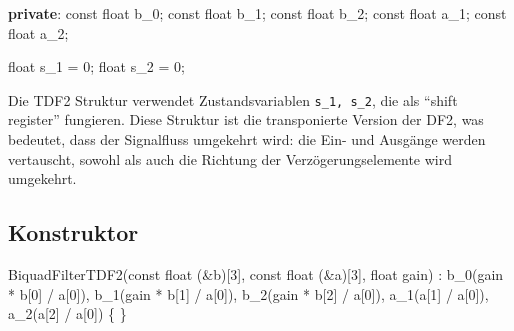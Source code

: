 \documentclass[
  ngerman,
  letterpaper,
  DIV=11]{scrreprt}
\newenvironment{Shaded}{\begin{snugshade}}{\end{snugshade}}
\newcommand{\AttributeTok}[1]{\textcolor[rgb]{0.40,0.45,0.13}{#1}}
\newcommand{\DataTypeTok}[1]{\textcolor[rgb]{0.68,0.00,0.00}{#1}}
\newcommand{\DecValTok}[1]{\textcolor[rgb]{0.68,0.00,0.00}{#1}}
\newcommand{\KeywordTok}[1]{\textcolor[rgb]{0.00,0.23,0.31}{\textbf{#1}}}
\newcommand{\NormalTok}[1]{\textcolor[rgb]{0.00,0.23,0.31}{#1}}
\newcommand{\OperatorTok}[1]{\textcolor[rgb]{0.37,0.37,0.37}{#1}}
\newcommand{\VariableTok}[1]{\textcolor[rgb]{0.07,0.07,0.07}{#1}}
\begin{document}
\begin{Shaded}
\begin{Highlighting}[]
\KeywordTok{private}\OperatorTok{:}
  \AttributeTok{const} \DataTypeTok{float}\NormalTok{ b\_0}\OperatorTok{;} 
  \AttributeTok{const} \DataTypeTok{float}\NormalTok{ b\_1}\OperatorTok{;}
  \AttributeTok{const} \DataTypeTok{float}\NormalTok{ b\_2}\OperatorTok{;}
  \AttributeTok{const} \DataTypeTok{float}\NormalTok{ a\_1}\OperatorTok{;}
  \AttributeTok{const} \DataTypeTok{float}\NormalTok{ a\_2}\OperatorTok{;}

  \DataTypeTok{float} \VariableTok{s\_1} \OperatorTok{=} \DecValTok{0}\OperatorTok{;}
  \DataTypeTok{float} \VariableTok{s\_2} \OperatorTok{=} \DecValTok{0}\OperatorTok{;}
\end{Highlighting}
\end{Shaded}

Die TDF2 Struktur verwendet Zustandsvariablen \texttt{s\_1,\ s\_2}, die
als ``shift register'' fungieren. Diese Struktur ist die transponierte
Version der DF2, was bedeutet, dass der Signalfluss umgekehrt wird: die
Ein- und Ausgänge werden vertauscht, sowohl als auch die Richtung der
Verzögerungselemente wird umgekehrt.

\subsection{Konstruktor}\label{konstruktor-2}

\begin{Shaded}
\begin{Highlighting}[]
\NormalTok{BiquadFilterTDF2}\OperatorTok{(}\AttributeTok{const} \DataTypeTok{float} \OperatorTok{(\&}\NormalTok{b}\OperatorTok{)[}\DecValTok{3}\OperatorTok{],} \AttributeTok{const} \DataTypeTok{float} \OperatorTok{(\&}\NormalTok{a}\OperatorTok{)[}\DecValTok{3}\OperatorTok{],} \DataTypeTok{float}\NormalTok{ gain}\OperatorTok{)}  
    \OperatorTok{:}\NormalTok{ b\_0}\OperatorTok{(}\NormalTok{gain }\OperatorTok{*}\NormalTok{ b}\OperatorTok{[}\DecValTok{0}\OperatorTok{]} \OperatorTok{/}\NormalTok{ a}\OperatorTok{[}\DecValTok{0}\OperatorTok{]),}
\NormalTok{      b\_1}\OperatorTok{(}\NormalTok{gain }\OperatorTok{*}\NormalTok{ b}\OperatorTok{[}\DecValTok{1}\OperatorTok{]} \OperatorTok{/}\NormalTok{ a}\OperatorTok{[}\DecValTok{0}\OperatorTok{]),}
\NormalTok{      b\_2}\OperatorTok{(}\NormalTok{gain }\OperatorTok{*}\NormalTok{ b}\OperatorTok{[}\DecValTok{2}\OperatorTok{]} \OperatorTok{/}\NormalTok{ a}\OperatorTok{[}\DecValTok{0}\OperatorTok{]),}
\NormalTok{      a\_1}\OperatorTok{(}\NormalTok{a}\OperatorTok{[}\DecValTok{1}\OperatorTok{]} \OperatorTok{/}\NormalTok{ a}\OperatorTok{[}\DecValTok{0}\OperatorTok{]),}
\NormalTok{      a\_2}\OperatorTok{(}\NormalTok{a}\OperatorTok{[}\DecValTok{2}\OperatorTok{]} \OperatorTok{/}\NormalTok{ a}\OperatorTok{[}\DecValTok{0}\OperatorTok{])} 
\OperatorTok{\{}
\OperatorTok{\}}
\end{Highlighting}
\end{Shaded}
\end{document}
